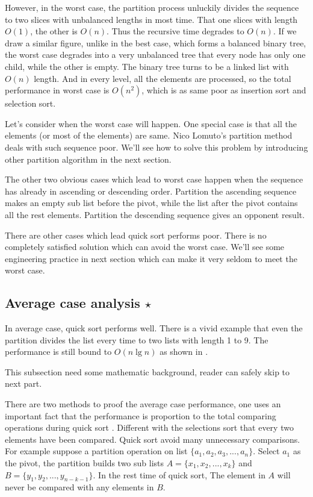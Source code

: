 \documentclass[UTF8]{article}
\begin{document}
However, in the worst case, the partition process unluckily divides the sequence to two slices
with unbalanced lengths in most time. That one slices with length $O(1)$, the other is $O(n)$.
Thus the recursive time degrades to $O(n)$. If we draw a similar figure, unlike in the best
case, which forms a balanced binary tree, the worst case degrades into a very unbalanced tree
that every node has only one child, while the other is empty. The binary tree turns to be
a linked list with $O(n)$ length. And in every level, all the elements are processed, so the
total performance in worst case is $O(n^2)$, which is as same poor as insertion sort and
selection sort.

Let's consider when the worst case will happen. One special case is that
all the elements (or most of the elements) are same. Nico Lomuto's partition method deals
with such sequence poor. We'll see how to solve this problem by introducing other
partition algorithm in the next section.

The other two obvious cases which lead to worst case happen when the sequence has already in
ascending or descending order. Partition the ascending sequence makes an empty sub list
before the pivot, while the list after the pivot contains all the rest elements.
Partition the descending sequence gives an opponent result.

There are other cases which lead quick sort performs poor. There is no completely satisfied solution
which can avoid the worst case. We'll see some engineering practice in next section which can
make it very seldom to meet the worst case.

\subsection{Average case analysis $\star$}
In average case, quick sort performs well. There is a vivid example that even the partition
divides the list every time to two lists with length 1 to 9. The performance is still bound
to $O(n \lg n)$ as shown in \cite{CLRS}.

This subsection need some mathematic background, reader can safely skip to next part.

There are two methods to proof the average case performance, one uses an important fact
that the performance is proportion to the total comparing operations during quick sort \cite{CLRS}.
Different with the selections sort that every two elements have been compared. Quick sort
avoid many unnecessary comparisons. For example suppose a partition operation on list
$\{ a_1, a_2, a_3, ..., a_n\}$. Select $a_1$ as the pivot, the partition builds two sub lists
$A = \{x_1, x_2, ..., x_k\}$ and $B = \{ y_1, y_2, ..., y_{n-k-1} \}$.
In the rest time of quick sort, The element in $A$ will never be compared with any elements in $B$.
\end{document}
